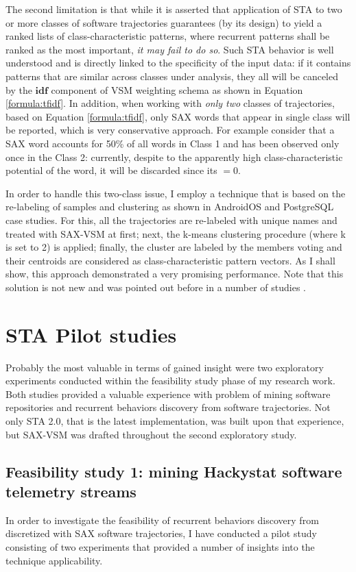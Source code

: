 The second limitation is that while it is asserted that application of STA to two or more classes of software trajectories guarantees (by its design) to yield a ranked lists of class-characteristic patterns, where recurrent patterns shall be ranked as the most important, \textit{it may fail to do so}. Such STA behavior is well understood and is directly linked to the specificity of the input data: if it contains patterns that are similar across classes under analysis, they all will be canceled by the $\textbf{idf}$ component of VSM weighting schema as shown in Equation \eqref{formula:tfidf}. In addition, when working with \textit{only two} classes of trajectories, based on Equation \eqref{formula:tfidf}, only SAX words that appear in single class will be reported, which is very conservative approach. For example consider that a SAX word accounts for 50\% of all words in Class 1 and has been observed only once in the Class 2: currently, despite to the apparently high class-characteristic potential of the word, it will be discarded since its \tfidf$=0$.

In order to handle this two-class issue, I employ a technique that is based on the re-labeling of samples and clustering as shown in AndroidOS and PostgreSQL case studies. For this, all the trajectories are re-labeled with unique names and treated with SAX-VSM at first; next, the k-means clustering procedure (where k is set to 2) is applied; finally, the cluster are labeled by the members voting and their centroids are considered as class-characteristic pattern vectors. As I shall show, this approach demonstrated a very promising performance. Note that this solution is not new and was pointed out before in a number of studies \cite{classification_centroids} \cite{salton-71} \cite{intro_ir_Manning}.

\section{STA Pilot studies}
Probably the most valuable in terms of gained insight were two exploratory experiments conducted within the feasibility study phase of my research work. Both studies provided a valuable experience with problem of mining software repositories and recurrent behaviors discovery from software trajectories. Not only STA 2.0, that is the latest implementation, was built upon that experience, but SAX-VSM was drafted throughout the second 
exploratory study.

\subsection{Feasibility study 1: mining Hackystat software telemetry streams}
In order to investigate the feasibility of recurrent behaviors discovery from discretized with SAX \cite{citeulike:2821475} software trajectories, I have conducted a pilot study consisting of two experiments that provided a number of insights into the technique applicability.  

